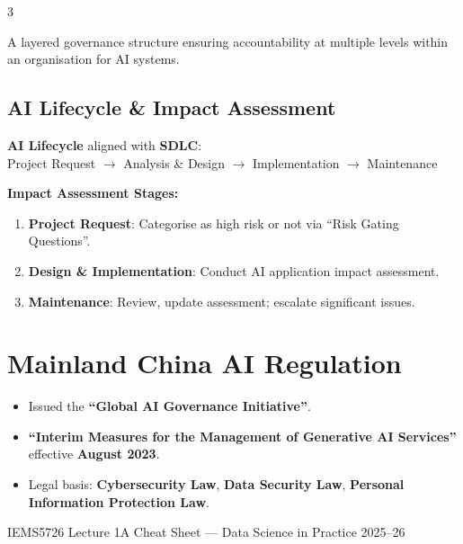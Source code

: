 \documentclass[a4paper,7pt]{extarticle}
\begin{document}
\begin{multicols}{3}
\begin{infobox}
A layered governance structure ensuring accountability at multiple levels within an organisation for AI systems.
\end{infobox}

\subsection{AI Lifecycle \& Impact Assessment}

\begin{exbox}
\textbf{AI Lifecycle} aligned with \textbf{SDLC}:\\
Project Request $\to$ Analysis \& Design $\to$ Implementation $\to$ Maintenance

\smallskip
\textbf{Impact Assessment Stages:}
\begin{enumerate}
  \item \textbf{Project Request}: Categorise as high risk or not via ``Risk Gating Questions''.
  \item \textbf{Design \& Implementation}: Conduct AI application impact assessment.
  \item \textbf{Maintenance}: Review, update assessment; escalate significant issues.
\end{enumerate}
\end{exbox}

\section{Mainland China AI Regulation}

\begin{defbox}
\begin{itemize}
  \item Issued the \textbf{``Global AI Governance Initiative''}.
  \item \textbf{``Interim Measures for the Management of Generative AI Services''} effective \textbf{August 2023}.
  \item Legal basis: \textbf{Cybersecurity Law}, \textbf{Data Security Law}, \textbf{Personal Information Protection Law}.
\end{itemize}
\end{defbox}

\vfill
\begin{center}
\fontsize{5.5}{6}\selectfont\color{gray}
IEMS5726 Lecture 1A Cheat Sheet --- Data Science in Practice 2025--26
\end{center}

\end{multicols}
\end{document}
